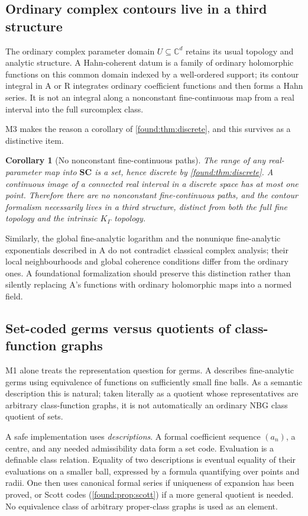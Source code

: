 \documentclass[11pt,letterpaper]{article}
\numberwithin{equation}{section}
\newtheorem{corollary}[theorem]{Corollary}
\theoremstyle{definition}
\theoremstyle{remark}
\newcommand{\SC}{\mathbf{SC}}
\newcommand{\C}{\mathbb C}
\begin{document}
\subsection{Ordinary complex contours live in a third structure}
\label{found:sub:contours}
The ordinary complex parameter domain $U\subseteq\C^d$ retains its usual
topology and analytic structure. A Hahn-coherent datum is a family of ordinary
holomorphic functions on this common domain indexed by a well-ordered support;
its contour integral in A or R integrates ordinary coefficient functions and
then forms a Hahn series. It is not an integral along a nonconstant
fine-continuous map from a real interval into the full surcomplex class.

M3 makes the reason a corollary of \cref{found:thm:discrete}, and this survives
as a distinctive item.

\begin{corollary}[No nonconstant fine-continuous paths]\label{found:cor:nopaths}
The range of any real-parameter map into $\SC$ is a set, hence discrete by
\cref{found:thm:discrete}. A continuous image of a connected real interval in a
discrete space has at most one point. Therefore there are no nonconstant
fine-continuous paths, and the contour formalism necessarily lives in a third
structure, distinct from both the full fine topology and the intrinsic
$K_\Gamma$ topology.
\end{corollary}

Similarly, the global fine-analytic logarithm and the nonunique fine-analytic
exponentials described in A do not contradict classical complex analysis; their
local neighbourhoods and global coherence conditions differ from the ordinary
ones. A foundational formalization should preserve this distinction rather than
silently replacing A's functions with ordinary holomorphic maps into a normed
field.

\subsection{Set-coded germs versus quotients of class-function graphs}
\label{found:sub:germs}
M1 alone treats the representation question for germs. A describes fine-analytic
germs using equivalence of functions on sufficiently small fine balls. As a
semantic description this is natural; taken literally as a quotient whose
representatives are arbitrary class-function graphs, it is not automatically an
ordinary NBG class quotient of sets.

A safe implementation uses \emph{descriptions}. A formal coefficient sequence
$(a_n)$, a centre, and any needed admissibility data form a set code. Evaluation
is a definable class relation. Equality of two descriptions is eventual equality
of their evaluations on a smaller ball, expressed by a formula quantifying over
points and radii. One then uses canonical formal series if uniqueness of
expansion has been proved, or Scott codes (\cref{found:prop:scott}) if a more
general quotient is needed. No equivalence class of arbitrary proper-class
graphs is used as an element.
\end{document}
